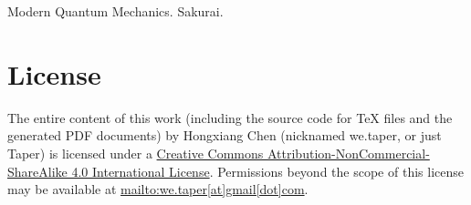 \documentclass{article}
\numberwithin{equation}{subsection} %
\theoremstyle{definition}
\begin{document}
\begin{thebibliography}{1}
     Modern Quantum Mechanics. Sakurai.
\end{thebibliography}
\printnomenclature
\section{License}
The entire content of this work (including the source code
for TeX files and the generated PDF documents) by 
Hongxiang Chen (nicknamed we.taper, or just Taper) is
licensed under a 
\href{http://creativecommons.org/licenses/by-nc-sa/4.0/}{Creative 
Commons Attribution-NonCommercial-ShareAlike 4.0 International 
License}. Permissions beyond the scope of this 
license may be available at \url{mailto:we.taper[at]gmail[dot]com}.
\end{document}
